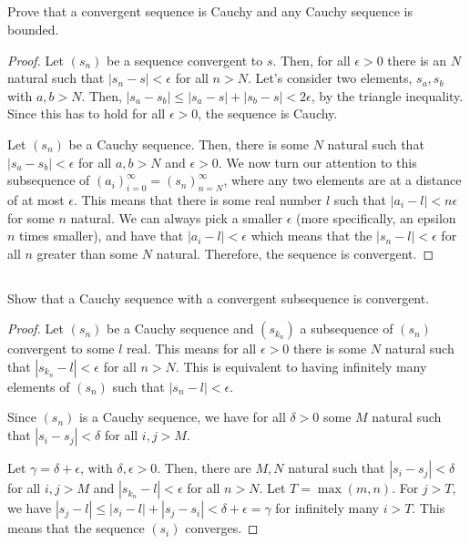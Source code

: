\subsection{} Prove that a convergent sequence is Cauchy and any Cauchy sequence is bounded.

\begin{proof}
Let $(s_n)$ be a sequence convergent to $s$. Then, for all $\epsilon > 0$ there is an $N$ natural such that $|s_n - s| < \epsilon$ for all $n > N$. Let's consider two elements, $s_a, s_b$ with $a,b > N$. Then, $|s_a - s_b| \leq |s_a - s| + |s_b - s| < 2\epsilon$, by the triangle inequality. Since this has to hold for all $\epsilon > 0$, the sequence is Cauchy.

Let $(s_n)$ be a Cauchy sequence. Then, there is some $N$ natural such that $|s_a - s_b| < \epsilon$ for all $a,b > N$ and $\epsilon > 0$. We now turn our attention to this subsequence of $(a_i)_{i=0}^{\infty} = (s_n)_{n=N}^{\infty}$, where any two elements are at a distance of at most $\epsilon$. This means that there is some real number $l$ such that  $|a_i - l| < n \epsilon$ for some $n$ natural. We can always pick a smaller $\epsilon$ (more specifically, an epsilon $n$ times smaller), and have that $|a_i - l| < \epsilon$ which means that the $|s_n - l| < \epsilon$ for all $n$ greater than some $N$ natural. Therefore, the sequence is convergent.
\end{proof}

\subsection{} Show that a Cauchy sequence with a convergent subsequence is convergent.
\begin{proof}

Let $(s_n)$ be a Cauchy sequence and $(s_{k_n})$ a subsequence of $(s_n)$ convergent to some $l$ real. This means for all $\epsilon>0$ there is some $N$ natural such that $|s_{k_n} - l| < \epsilon$ for all $n > N$. This is equivalent to having infinitely many elements of $(s_n)$ such that $|s_n - l| < \epsilon$.

Since $(s_n)$ is a Cauchy sequence, we have for all $\delta > 0$ some $M$ natural such that $|s_i - s_j| < \delta$ for all $i, j > M$.




Let $\gamma=\delta+\epsilon$, with $\delta, \epsilon>0$. Then, there are $M,N$ natural such that $|s_i - s_j| < \delta$ for all $i, j > M$ and $|s_{k_n} - l| < \epsilon$ for all $n > N$. Let $T = \max(m,n)$. For $j > T$, we have $|s_j - l| \leq |s_i - l| + |s_j - s_i| < \delta + \epsilon = \gamma$ for infinitely many $i>T$. This means that the sequence $(s_i)$ converges.


\end{proof}

